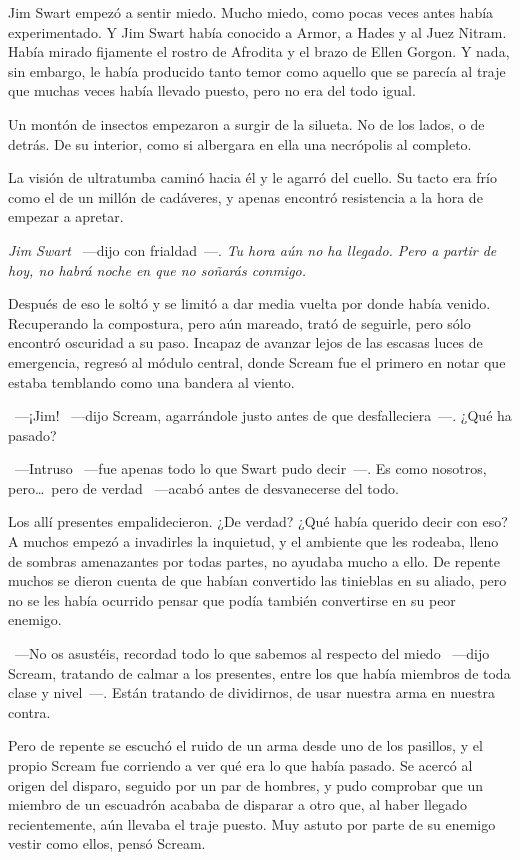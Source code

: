Jim Swart empezó a sentir miedo. Mucho miedo, como pocas veces antes había experimentado. Y Jim Swart había conocido a Armor, a Hades y al Juez Nitram. Había mirado fijamente el rostro de Afrodita y el brazo de Ellen Gorgon. Y nada, sin embargo, le había producido tanto temor como aquello que se parecía al traje que muchas veces había llevado puesto, pero no era del todo igual.

Un montón de insectos empezaron a surgir de la silueta. No de los lados, o de detrás. De su interior, como si albergara en ella una necrópolis al completo.

La visión de ultratumba caminó hacia él y le agarró del cuello. Su tacto era frío como el de un millón de cadáveres, y apenas encontró resistencia a la hora de empezar a apretar.

\emph{Jim Swart} ~---dijo con frialdad~---. \emph{Tu hora aún no ha llegado. Pero a partir de hoy, no habrá noche en que no soñarás conmigo.}

Después de eso le soltó y se limitó a dar media vuelta por donde había venido. Recuperando la compostura, pero aún mareado, trató de seguirle, pero sólo encontró oscuridad a su paso. Incapaz de avanzar lejos de las escasas luces de emergencia, regresó al módulo central, donde Scream fue el primero en notar que estaba temblando como una bandera al viento.

~---¡Jim! ~---dijo Scream, agarrándole justo antes de que desfalleciera~---. ¿Qué ha pasado?

~---Intruso ~---fue apenas todo lo que Swart pudo decir~---. Es como nosotros, pero\dots\ pero de verdad ~---acabó antes de desvanecerse del todo.

Los allí presentes empalidecieron. ¿De verdad? ¿Qué había querido decir con eso? A muchos empezó a invadirles la inquietud, y el ambiente que les rodeaba, lleno de sombras amenazantes por todas partes, no ayudaba mucho a ello. De repente muchos se dieron cuenta de que habían convertido las tinieblas en su aliado, pero no se les había ocurrido pensar que podía también convertirse en su peor enemigo.

~---No os asustéis, recordad todo lo que sabemos al respecto del miedo ~---dijo Scream, tratando de calmar a los presentes, entre los que había miembros de toda clase y nivel~---. Están tratando de dividirnos, de usar nuestra arma en nuestra contra.

Pero de repente se escuchó el ruido de un arma desde uno de los pasillos, y el propio Scream fue corriendo a ver qué era lo que había pasado. Se acercó al origen del disparo, seguido por un par de hombres, y pudo comprobar que un miembro de un escuadrón acababa de disparar a otro que, al haber llegado recientemente, aún llevaba el traje puesto. Muy astuto por parte de su enemigo vestir como ellos, pensó Scream.

